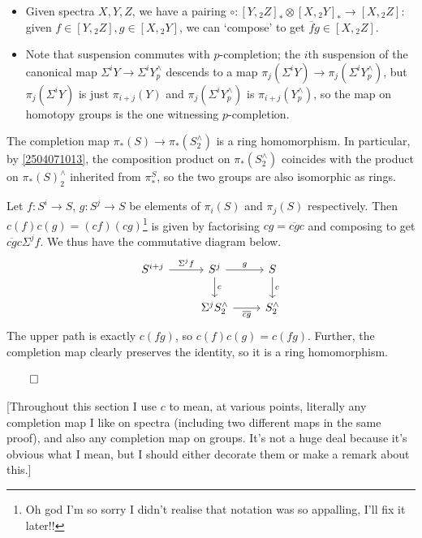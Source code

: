 \documentclass{MetricNotes2023}
\def\done{\begin{flushright}\vspace{-4.35ex}\(\qed\)\end{flushright}}
\begin{document}
\begin{itemize}
\item Given spectra \(X, Y, Z\), we have a pairing \(\circ : [Y, \text{}_2Z]_* \otimes [X,\text{}_2Y]_* \to [X, \text{}_2Z]\): given \(f \in [Y, \text{}_2Z], g \in [X, \text{}_2Y]\), we can `compose' to get \(\overline fg\in [X, \text{}_2Z]\). 

\item Note that suspension commutes with \(p\)-completion; the \(i\)th suspension of the canonical map \(\Sigma^i Y \to \Sigma^iY^\wedge_p\) descends to a map \(\pi_j(\Sigma^iY)\to \pi_j(\Sigma^iY^\wedge_p)\), but \(\pi_j(\Sigma^iY)\) is just \(\pi_{i+j}(Y)\) and \(\pi_{j}(\Sigma^i Y^\wedge_p)\) is \(\pi_{i+j}(Y^\wedge_p)\), so the map on homotopy groups is the one witnessing \(p\)-completion. 
\end{itemize}

\begin{lemma}
The completion map \(\pi_*(S) \to \pi_*(S^\wedge_2)\) is a ring homomorphism. In particular, by \ref{2504071013}, the composition product on \(\pi_*(S^\wedge_2)\) coincides with the product on \(\pi_*(S)^\wedge_2\) inherited from \(\pi_*^S\), so the two groups are also isomorphic as rings. 
\end{lemma}

\begin{ourproof}
Let \(f : S^i \to S\), \(g : S^j \to S\) be elements of \(\pi_i(S)\) and \(\pi_j(S)\) respectively. Then \(c(f)c(g)=(cf)(cg)\)\footnote{Oh god I'm so sorry I didn't realise that notation was so appalling, I'll fix it later!!} is given by factorising \(cg=\overline{cg}c\) and composing to get \(\overline{cg}c\Sigma^jf\). We thus have the commutative diagram below.
\[\begin{tikzcd}
S^{i+j} \arrow[r, "\Sigma^j f"]  & S^j \arrow[r, "g"] \arrow[d, "c"] & S \arrow[d, "c"] \\ 
 & \Sigma^jS^\wedge_2  \arrow[r, "\overline{cg}"'] & S^\wedge_2 
 \end{tikzcd}\] 
The upper path is exactly \(c(fg)\), so \(c(f)c(g)=c(fg)\). Further, the completion map clearly preserves the identity, so it is a ring homomorphism.\done
\end{ourproof}

[Throughout this section I use \(c\) to mean, at various points, literally any completion map I like on spectra (including two different maps in the same proof), and also any completion map on groups. It's not a huge deal because it's obvious what I mean, but I should either decorate them or make a remark about this.]
\end{document}
